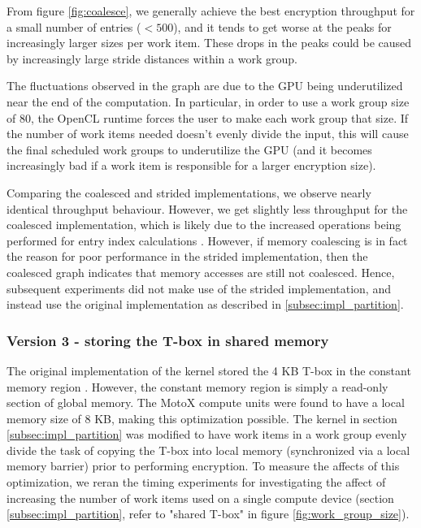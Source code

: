 \documentclass[conference,10pt]{IEEEtran}
\begin{document}
From figure \ref{fig:coalesce}, we generally achieve the best encryption throughput for a small number of 
entries ($< 500$), and it tends to get worse at the peaks for increasingly larger sizes per work item.  
These drops in the peaks could be caused by increasingly large stride distances within a work group. 

The fluctuations observed in the graph are due to the GPU being underutilized near the end of the 
computation.  In particular, in order to use a work group size of 80, the OpenCL runtime forces the user to 
make each work group that size.  If the number of work items needed doesn't evenly divide the input, this 
will cause the final scheduled work groups to underutilize the GPU (and it becomes increasingly bad if a 
work item is responsible for a larger encryption size).

Comparing the coalesced and strided implementations, we observe nearly identical throughput behaviour.  
However, we get slightly less throughput for the coalesced implementation, which is likely due to the 
increased operations being performed for entry index calculations \cite{opencl_guide}.  However, if memory 
coalescing is in fact the reason for poor performance in the strided implementation, then the coalesced 
graph indicates that memory accesses are still not coalesced.  Hence, subsequent experiments did not make 
use of the strided implementation, and instead use the original implementation as described in 
\ref{subsec:impl_partition}.

\subsubsection{Version 3 - storing the T-box in shared memory}
\label{subsec:impl_shared_tbox}

The original implementation of the kernel stored the 4 KB T-box in the constant memory region 
\cite{opencl_impl}.  However, the constant memory region is simply a read-only section of global memory.  
The MotoX compute units were found to have a local memory size of 8 KB, making this optimization possible.  
The kernel in section \ref{subsec:impl_partition} was modified to have work items in a work group evenly 
divide the task of copying the T-box into local memory (synchronized via a local memory barrier) prior to 
performing encryption.  To measure the affects of this optimization, we reran the timing experiments for 
investigating the affect of increasing the number of work items used on a single compute device (section 
\ref{subsec:impl_partition}, refer to "shared T-box" in figure \ref{fig:work_group_size}). 
\end{document}
